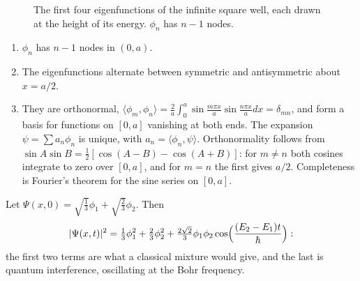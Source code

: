 \begin{figure}[ht]
\centering
{}
\caption{The first four eigenfunctions of the infinite square well, each drawn at the height of its energy. $\phi_n$ has $n-1$ nodes.}
\end{figure}

\begin{fact}
\leavevmode
\begin{enumerate}
    \item $\phi_n$ has $n-1$ nodes in $(0,a)$.
    \item The eigenfunctions alternate between symmetric and antisymmetric about $x = a/2$.
    \item They are orthonormal, $\langle\phi_m,\phi_n\rangle = \frac2a\int_0^a\sin\frac{m\pi x}{a}\sin\frac{n\pi x}{a}dx = \delta_{mn}$, and form a basis for functions on $[0,a]$ vanishing at both ends. The expansion $\psi = \sum a_n\phi_n$ is unique, with $a_n = \langle\phi_n,\psi\rangle$. Orthonormality follows from $\sin A\sin B = \frac12[\cos(A-B)-\cos(A+B)]$: for $m\neq n$ both cosines integrate to zero over $[0,a]$, and for $m = n$ the first gives $a/2$. Completeness is Fourier's theorem for the sine series on $[0,a]$.
\end{enumerate}
\end{fact}

\begin{example}
Let $\Psi(x,0) = \sqrt{\tfrac13}\phi_1 + \sqrt{\tfrac23}\phi_2$. Then
\[
    |\Psi(x,t)|^2 = \tfrac13\phi_1^2 + \tfrac23\phi_2^2 + \tfrac{2\sqrt2}{3}\phi_1\phi_2\cos\Bigl(\frac{(E_2-E_1)t}{\hbar}\Bigr):
\]
the first two terms are what a classical mixture would give, and the last is quantum interference, oscillating at the Bohr frequency.
\end{example}

